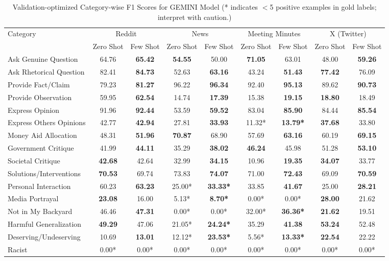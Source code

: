 \begin{table}[htbp]
\centering
\begin{tabular}{l *{8}{c}}
\toprule
Category & \multicolumn{2}{c}{Reddit} & \multicolumn{2}{c}{News} & \multicolumn{2}{c}{Meeting Minutes} & \multicolumn{2}{c}{X (Twitter)} \\
& Zero Shot & Few Shot & Zero Shot & Few Shot & Zero Shot & Few Shot & Zero Shot & Few Shot \\
\midrule
Ask Genuine Question & 64.76 & \textbf{65.42} & \textbf{54.55} & 50.00 & \textbf{71.05} & 63.01 & 48.00 & \textbf{59.26} \\
Ask Rhetorical Question & 82.41 & \textbf{84.73} & 52.63 & \textbf{63.16} & 43.24 & \textbf{51.43} & \textbf{77.42} & 76.09 \\
Provide Fact/Claim & 79.23 & \textbf{81.27} & 96.22 & \textbf{96.34} & 92.40 & \textbf{95.13} & 89.62 & \textbf{90.73} \\
Provide Observation & 59.95 & \textbf{62.54} & 14.74 & \textbf{17.39} & 15.38 & \textbf{19.15} & \textbf{18.80} & 18.49 \\
Express Opinion & 91.96 & \textbf{92.44} & 53.59 & \textbf{59.52} & 83.04 & \textbf{85.90} & 84.44 & \textbf{85.54} \\
Express Others Opinions & 42.77 & \textbf{42.94} & 27.81 & \textbf{33.93} & 11.32* & \textbf{13.79*} & \textbf{37.68} & 33.80 \\
Money Aid Allocation & 48.31 & \textbf{51.96} & \textbf{70.87} & 68.90 & 57.69 & \textbf{63.16} & 60.19 & \textbf{69.15} \\
Government Critique & 41.99 & \textbf{44.11} & 35.29 & \textbf{38.02} & \textbf{46.24} & 45.98 & 51.28 & \textbf{53.10} \\
Societal Critique & \textbf{42.68} & 42.64 & 32.99 & \textbf{34.15} & 10.96 & \textbf{19.35} & \textbf{34.07} & 33.77 \\
Solutions/Interventions & \textbf{70.53} & 69.74 & 73.83 & \textbf{74.07} & 71.00 & \textbf{72.43} & 69.09 & \textbf{70.59} \\
Personal Interaction & 60.23 & \textbf{63.23} & 25.00* & \textbf{33.33*} & 33.85 & \textbf{41.67} & 25.00 & \textbf{28.21} \\
Media Portrayal & \textbf{23.08} & 16.00 & 5.13* & \textbf{8.70*} & 0.00* & 0.00* & \textbf{28.00} & 21.62 \\
Not in My Backyard & 46.46 & \textbf{47.31} & 0.00* & 0.00* & 32.00* & \textbf{36.36*} & \textbf{21.62} & 19.51 \\
Harmful Generalization & \textbf{49.29} & 47.06 & 21.05* & \textbf{24.24*} & 35.29 & \textbf{41.38} & \textbf{53.24} & 52.48 \\
Deserving/Undeserving & 10.69 & \textbf{13.01} & 12.12* & \textbf{23.53*} & 5.56* & \textbf{13.33*} & \textbf{22.54} & 22.22 \\
Racist & 0.00* & 0.00* & 0.00* & 0.00* & 0.00* & 0.00* & 0.00* & 0.00* \\
\bottomrule
\end{tabular}
\centering\caption{Validation-optimized Category-wise F1 Scores for GEMINI Model (* indicates $<$5 positive examples in gold labels; interpret with caution.)}
\label{tab:gemini_category_breakdown}
\end{table}